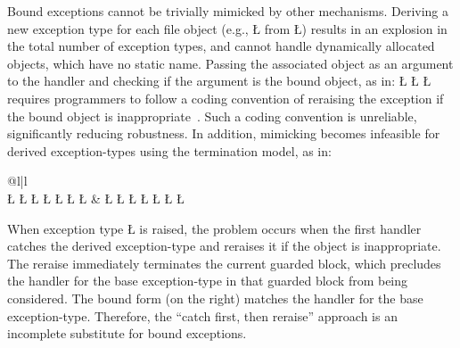 \documentclass[openright,twoside]{report}
\begin{document}
\begin{annotation}
Bound exceptions cannot be trivially mimicked by other mechanisms.
Deriving a new exception type for each file object (e.g., \LGinlinetrue\LGbegin\lgrinde\L{}\endlgrinde\LGend{} from \LGinlinetrue\LGbegin\lgrinde\L{}\endlgrinde\LGend{}) results in an explosion in the total number of exception types, and cannot handle dynamically allocated objects, which have no static name.
Passing the associated object as an argument to the handler and checking if the argument is the bound object, as in:
\LGinlinefalse\LGbegin\lgrinde
\L{}
\CE{}\L{\LB{}}
\CE{}\L{\LB{}}
\CE{}\endlgrinde\LGend
requires programmers to follow a coding convention of reraising the exception if the bound object is inappropriate~\cite{Buhr92b}.
Such a coding convention is unreliable, significantly reducing robustness.
In addition, mimicking becomes infeasible for derived exception-types using the termination model, as in:
{\par
\begin{tabular}{@{}l|l}
\\
\LGinlinefalse\LGbegin\lgrinde
\L{\LB{}}
\CE{}\L{}
\L{\LB{}}
\CE{}\L{\LB{}}
\CE{}\L{}
\L{\LB{}}
\CE{}\L{\LB{}}
\CE{}\endlgrinde\LGend
&
\LGindent=0pt
\LGinlinefalse\LGbegin\lgrinde
\L{}
\CE{}\L{}
\L{\LB{}}
\L{\LB{}}
\L{}
\L{\LB{}}
\L{\LB{}}
\endlgrinde\LGend
\end{tabular}
\par}
\noindent
When exception type \LGinlinetrue\LGbegin\lgrinde\L{}\endlgrinde\LGend{} is raised, the problem occurs when the first handler catches the derived exception-type and reraises it if the object is inappropriate.
The reraise immediately terminates the current guarded block, which precludes the handler for the base exception-type in that guarded block from being considered.
The bound form (on the right) matches the handler for the base exception-type.
Therefore, the ``catch first, then reraise'' approach is an incomplete substitute for bound exceptions.
\end{annotation}
\end{document}
